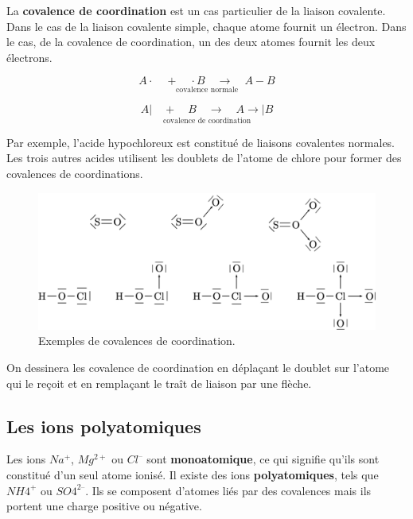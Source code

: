 \documentclass[
  11pt,
  french,
  a4paper,
  openany]{book}
\begin{document}
La \textbf{covalence de coordination} est un cas particulier de la liaison covalente. Dans le cas de la liaison covalente simple, chaque atome fournit un électron. Dans le cas, de la covalence de coordination, un des deux atomes fournit les deux électrons.

\[ \underset{\text{covalence normale}}{A \cdot \quad + \quad \cdot B \quad \longrightarrow \quad A - B} \]

\[ \underset{\text{covalence de coordination}}{A | \quad + \quad B \quad \longrightarrow \quad A \rightarrow | B} \]

Par exemple, l'acide hypochloreux est constitué de liaisons covalentes normales. Les trois autres acides utilisent les doublets de l'atome de chlore pour former des covalences de coordinations.

\begin{figure}

{\centering \includegraphics[width=0.85\linewidth]{images/covalences-coordination} 

}

\caption{Exemples de covalences de coordination.}\label{fig:covalences-coordination}
\end{figure}

On dessinera les covalence de coordination en déplaçant le doublet sur l'atome qui le reçoit et en remplaçant le traît de liaison par une flèche.

\hypertarget{les-ions-polyatomiques}{%
\subsection{Les ions polyatomiques}\label{les-ions-polyatomiques}}

Les ions \(Na^+\), \(Mg^{2+}\) ou \(Cl^–\) sont \textbf{monoatomique}, ce qui signifie qu'ils sont constitué d'un seul atome ionisé. Il existe des ions \textbf{polyatomiques}, tels que \(NH4^+\) ou \(SO4^{2–}\). Ils se composent d'atomes liés par des covalences mais ils portent une charge positive ou négative.
\end{document}
